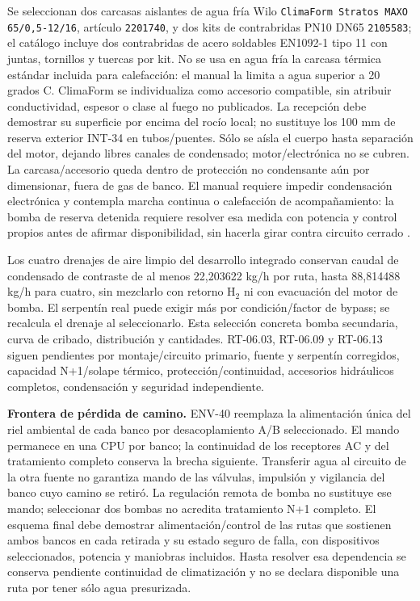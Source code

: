 Se seleccionan dos carcasas aislantes de agua fría Wilo \texttt{ClimaForm Stratos MAXO 65/0,5-12/16}, artículo \texttt{2201740}, y dos kits de contrabridas PN10 DN65 \texttt{2105583}; el catálogo incluye dos contrabridas de acero soldables EN1092-1 tipo 11 con juntas, tornillos y tuercas por kit. No se usa en agua fría la carcasa térmica estándar incluida para calefacción: el manual la limita a agua superior a 20 grados C. ClimaForm se individualiza como accesorio compatible, sin atribuir conductividad, espesor o clase al fuego no publicados. La recepción debe demostrar su superficie por encima del rocío local; no sustituye los 100 mm de reserva exterior INT-34 en tubos/puentes. Sólo se aísla el cuerpo hasta separación del motor, dejando libres canales de condensado; motor/electrónica no se cubren. La carcasa/accesorio queda dentro de protección no condensante aún por dimensionar, fuera de gas de banco. El manual requiere impedir condensación electrónica y contempla marcha continua o calefacción de acompañamiento: la bomba de reserva detenida requiere resolver esa medida con potencia y control propios antes de afirmar disponibilidad, sin hacerla girar contra circuito cerrado \parencite[p.~111]{lote37-wilo-curva}\parencite[p.~29]{lote37-wilo-instalacion}.

Los cuatro drenajes de aire limpio del desarrollo integrado conservan caudal de condensado de contraste de al menos 22,203622 kg/h por ruta, hasta 88,814488 kg/h para cuatro, sin mezclarlo con retorno H$_2$ ni con evacuación del motor de bomba. El serpentín real puede exigir más por condición/factor de bypass; se recalcula el drenaje al seleccionarlo. Esta selección concreta bomba secundaria, curva de cribado, distribución y cantidades. RT-06.03, RT-06.09 y RT-06.13 siguen pendientes por montaje/circuito primario, fuente y serpentín corregidos, capacidad N+1/solape térmico, protección/continuidad, accesorios hidráulicos completos, condensación y seguridad independiente.

\textbf{Frontera de pérdida de camino.} ENV-40 reemplaza la alimentación única del riel ambiental de cada banco por desacoplamiento A/B seleccionado. El mando permanece en una CPU por banco; la continuidad de los receptores AC y del tratamiento completo conserva la brecha siguiente. Transferir agua al circuito de la otra fuente no garantiza mando de las válvulas, impulsión y vigilancia del banco cuyo camino se retiró. La regulación remota de bomba no sustituye ese mando; seleccionar dos bombas no acredita tratamiento N+1 completo. El esquema final debe demostrar alimentación/control de las rutas que sostienen ambos bancos en cada retirada y su estado seguro de falla, con dispositivos seleccionados, potencia y maniobras incluidos. Hasta resolver esa dependencia se conserva pendiente continuidad de climatización y no se declara disponible una ruta por tener sólo agua presurizada.


